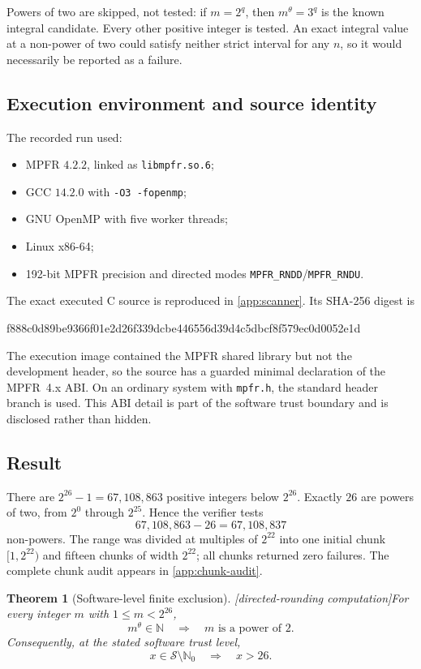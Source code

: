 \documentclass[11pt,oneside]{article}
\newtheorem{theorem}{Theorem}[section]
\theoremstyle{definition}
\newcommand{\N}{\mathbb N}
\newcommand{\Nzero}{\mathbb N_0}
\newcommand{\Sol}{\mathcal S}
\newcommand{\tagComp}{\textcolor{BurntOrange}{\textsf{[directed-rounding computation]}}}
\begin{document}
Powers of two are skipped, not tested: if \(m=2^q\), then
\(m^\theta=3^q\) is the known integral candidate.  Every other positive integer is tested.
An exact integral value at a non-power of two could satisfy neither strict interval for any
\(n\), so it would necessarily be reported as a failure.

\subsection{Execution environment and source identity}

The recorded run used:
\begin{itemize}
\item MPFR \(4.2.2\), linked as \texttt{libmpfr.so.6};
\item GCC \(14.2.0\) with \texttt{-O3 -fopenmp};
\item GNU OpenMP with five worker threads;
\item Linux x86-64;
\item 192-bit MPFR precision and directed modes \texttt{MPFR\_RNDD}/\texttt{MPFR\_RNDU}.
\end{itemize}
The exact executed C source is reproduced in \cref{app:scanner}.  Its SHA-256 digest is
\begin{center}
\small\ttfamily
f888c0d89be9366f01e2d26f339dcbe446556d39d4c5dbcf8f579ec0d0052e1d
\end{center}
The execution image contained the MPFR shared library but not the development header, so
the source has a guarded minimal declaration of the MPFR~4.x ABI.  On an ordinary system
with \texttt{mpfr.h}, the standard header branch is used.  This ABI detail is part of the
software trust boundary and is disclosed rather than hidden.

\subsection{Result}

There are \(2^{26}-1=67{,}108{,}863\) positive integers below \(2^{26}\).  Exactly
\(26\) are powers of two, from \(2^0\) through \(2^{25}\).  Hence the verifier tests
\[
  67{,}108{,}863-26
  =\boxed{67{,}108{,}837}
\]
non-powers.  The range was divided at multiples of \(2^{22}\) into one initial chunk
\([1,2^{22})\) and fifteen chunks of width \(2^{22}\); all chunks
returned zero failures.  The complete chunk audit appears in \cref{app:chunk-audit}.

\begin{theorem}[Software-level finite exclusion]\label{thm:finite-26}
\tagComp For every integer \(m\) with \(1\le m<2^{26}\),
\[
  m^\theta\in\N
  \quad\Longrightarrow\quad
  m\text{ is a power of }2.
\]
Consequently, at the stated software trust level,
\[
  x\in\Sol\setminus\Nzero
  \quad\Longrightarrow\quad
  \boxed{x>26}.
\]
\end{theorem}
\end{document}
